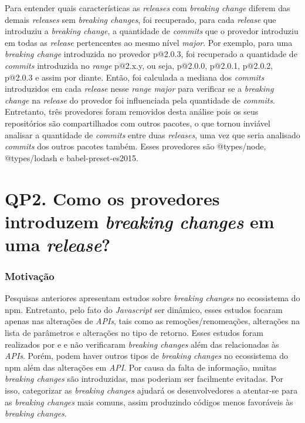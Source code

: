 Para entender quais características as \textit{releases} com \textit{breaking change} diferem das demais \textit{releases} sem \textit{breaking changes}, foi recuperado, para cada \textit{release} que introduziu a \textit{breaking change}, a quantidade de \textit{commits} que o provedor introduziu em todas as \textit{release} pertencentes ao mesmo nível \textit{major}. Por exemplo, para uma \textit{breaking change} introduzida no provedor \textsf{p@2.0.3}, foi recuperado a quantidade de \textit{commits} introduzida no \textit{range}  \textsf{p@2.x.y}, ou seja, \textsf{p@2.0.0}, \textsf{p@2.0.1}, \textsf{p@2.0.2}, \textsf{p@2.0.3} e assim por diante. Então, foi calculada a mediana dos \textit{commits} introduzidos em cada \textit{release} nesse \textit{range major} para verificar se a \textit{breaking change} na \textit{release} do provedor foi influenciada pela quantidade de \textit{commits}. Entretanto, três provedores foram removidos desta análise pois os seus repositórios são compartilhados com outros pacotes, o que tornou inviável analisar a quantidade de \textit{commits} entre duas \textit{releases}, uma vez que seria analisado \textit{commits} dos outros pacotes também. Esses provedores são \textsf{@types/node}, \textsf{@types/lodash} e \textsf{babel-preset-es2015}.


\section{QP2. Como os provedores introduzem \textit{breaking changes} em uma \textit{release}?}
\label{sec:qp2}

\subsubsection{Motivação}
\label{sec:qp2:motivation}
Pesquisas anteriores apresentam estudos sobre \textit{breaking changes} no ecossistema do \textsf{npm}. Entretanto, pelo fato do \textit{Javascript} ser dinâmico, esses estudos focaram apenas nas alterações de \textit{APIs}, tais como as remoções/renomeações, alterações na lista de parâmetros e alterações no tipo de retorno. Esses estudos foram realizados por   e  e não verificaram \textit{breaking changes} além das relacionadas às \textit{APIs}. Porém, podem haver outros tipos de \textit{breaking changes} no ecossistema do \textsf{npm} além das alterações em \textit{API}. Por causa da falta de informação, muitas \textit{breaking changes} são introduzidas, mas poderiam ser facilmente evitadas. Por isso, categorizar as \textit{breaking changes} ajudará os desenvolvedores a atentar-se para as \textit{breaking changes} mais comuns, assim produzindo códigos menos favoráveis às \textit{breaking changes}.

